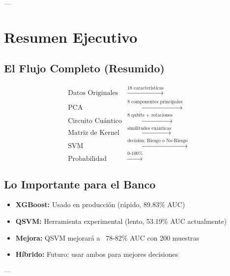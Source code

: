 \documentclass[11pt,a4paper,spanish]{article}
\begin{document}
---

\section{Resumen Ejecutivo}

\subsection{El Flujo Completo (Resumido)}

\[
\begin{aligned}
\text{Datos Originales} &\xrightarrow{\text{18 características}}\\
\text{PCA} &\xrightarrow{\text{8 componentes principales}}\\
\text{Circuito Cuántico} &\xrightarrow{\text{8 qubits + rotaciones}}\\
\text{Matriz de Kernel} &\xrightarrow{\text{similitudes cuánticas}}\\
\text{SVM} &\xrightarrow{\text{decisión: Riesgo o No-Riesgo}}\\
\text{Probabilidad} &\xrightarrow{\text{0-100\%}}
\end{aligned}
\]

\subsection{Lo Importante para el Banco}

\begin{itemize}
    \item \textbf{XGBoost:} Usado en producción (rápido, 89.83\% AUC)
    \item \textbf{QSVM:} Herramienta experimental (lento, 53.19\% AUC actualmente)
    \item \textbf{Mejora:} QSVM mejorará a ~78-82\% AUC con 200 muestras
    \item \textbf{Híbrido:} Futuro: usar ambos para mejores decisiones
\end{itemize}

---
\end{document}
